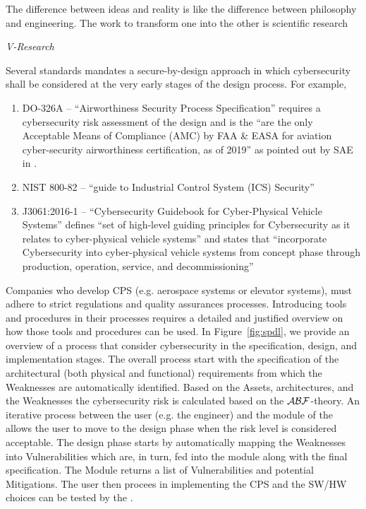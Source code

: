 \epigraph{The difference between ideas and reality is like the
difference between philosophy and engineering. The work to transform one into
the other is scientific research}{{\itshape V-Research}}

Several standards mandates a secure-by-design approach in which 
cybersecurity shall be considered at the very early stages of the 
design process. For example,
\begin{enumerate}[noitemsep]
	\item DO-326A -- ``Airworthiness Security Process Specification''
		requires a cybersecurity risk assessment of the design and is
		the ``are the only Acceptable Means of Compliance (AMC) by FAA
		\& EASA for aviation cyber-security airworthiness certification,
		as of 2019'' as pointed out by SAE in \autocite{SAE2019DO326A}.
	\item NIST 800-82 \autocite{Stouffer2011guide} -- ``guide to Industrial
		Control System (ICS) Security''
	\item J3061:2016-1 \autocite{SAE2016J3061} -- ``Cybersecurity Guidebook
		for Cyber-Physical Vehicle Systems'' defines ``set of
		high-level guiding principles for Cybersecurity as it relates
		to cyber-physical vehicle systems'' and states that
		``incorporate Cybersecurity into cyber-physical vehicle systems
		from concept phase through production, operation, service, and
		decommissioning''
\end{enumerate}
Companies who develop CPS (e.g. aerospace systems or elevator systems), must adhere
to strict regulations and quality assurances processes. Introducing tools and procedures 
in their processes requires a detailed and justified overview on how those
tools and procedures can be used. In Figure~\ref{fig:spdl}, we provide an overview
of a process that consider cybersecurity in the specification, design, and implementation
stages. The overall process start with the specification of the architectural (both physical
and functional) requirements from which the Weaknesses are automatically identified.
Based on the Assets, architectures, and the Weaknesses the cybersecurity risk is
calculated based on the $\mathcal{A}\mathcal{B}\mathcal{F}$-theory. An iterative process between 
the user (e.g. the engineer) and the \secramod module of the \abftool allows the user to move to the design phase
when the risk level is considered acceptable. The design phase starts by automatically mapping
the Weaknesses into Vulnerabilities which are, in turn, fed into the \designverifmod
module along with the final specification. The Module returns a list of Vulnerabilities and
potential Mitigations. The user then procees in implementing the CPS and the SW/HW choices
can be tested by the \atgmod. 

